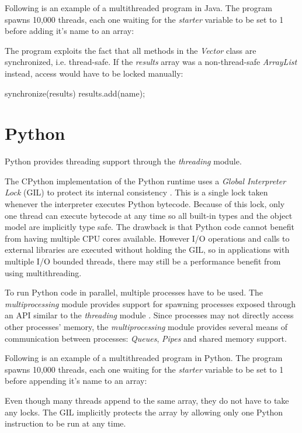 \documentclass[bachelor,english]{hgbthesis}
\begin{document}
Following is an example of a multithreaded program in Java. The program spawns 10,000 threads, each one waiting for the \textit{starter} variable to be set to 1 before adding it's name to an array:


The program exploits the fact that all methods in the \textit{Vector} class are synchronized, i.e. thread-safe. If the \textit{results} array was a non-thread-safe \textit{ArrayList} instead, access would have to be locked manually:

\begin{JavaCode}
synchronize(results) {
    results.add(name);
}
\end{JavaCode}

\section{Python}

Python provides threading support through the \textit{threading} module.

The CPython implementation of the Python runtime uses a \textit{Global Interpreter Lock} (GIL) to protect its internal consistency \cite{PythonThreadingManual}. This is a single lock taken whenever the interpreter executes Python bytecode. Because of this lock, only one thread can execute bytecode at any time so all built-in types and the object model are implicitly type safe. The drawback is that Python code cannot benefit from having multiple CPU cores available. However I/O operations and calls to external libraries are executed without holding the GIL, so in applications with multiple I/O bounded threads, there may still be a performance benefit from using multithreading.

To run Python code in parallel, multiple processes have to be used. The \textit{multiprocessing} module provides support for spawning processes exposed through an API similar to the \textit{threading} module \cite{PythonMultiProcessingManual}. Since processes may not directly access other processes' memory, the \textit{multiprocessing} module provides several means of communication between processes: \textit{Queues}, \textit{Pipes} and shared memory support.

Following is an example of a multithreaded program in Python. The program spawns 10,000 threads, each one waiting for the \textit{starter} variable to be set to 1 before appending it's name to an array:


Even though many threads append to the same array, they do not have to take any locks. The GIL implicitly protects the array by allowing only one Python instruction to be run at any time.
\end{document}
